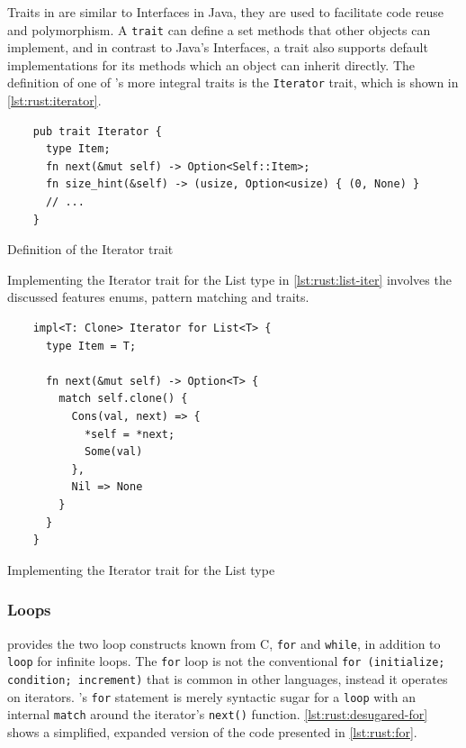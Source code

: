 Traits in \rust are similar to Interfaces in Java, they are used to facilitate code reuse and polymorphism.
A \texttt{trait} can define a set methods that other objects can implement, and in contrast to Java's Interfaces, a trait also supports default implementations for its methods which an object can inherit directly.
The definition of one of \rust's more integral traits is the \texttt{Iterator} trait, which is shown in \autoref{lst:rust:iterator}.

\begin{listing}[H]
  \begin{verbatim}
    pub trait Iterator {
      type Item;
      fn next(&mut self) -> Option<Self::Item>;
      fn size_hint(&self) -> (usize, Option<usize) { (0, None) }
      // ...
    }
  \end{verbatim}
  \caption{Definition of the Iterator trait}
  \label{lst:rust:iterator}
\end{listing}

Implementing the Iterator trait for the List type in \autoref{lst:rust:list-iter} involves the discussed features enums, pattern matching and traits.

\begin{listing}[H]
  \begin{verbatim}
    impl<T: Clone> Iterator for List<T> {
      type Item = T;

      fn next(&mut self) -> Option<T> {
        match self.clone() {
          Cons(val, next) => {
            *self = *next;
            Some(val)
          },
          Nil => None
        }
      }
    }
  \end{verbatim}
  \caption{Implementing the Iterator trait for the List type}
  \label{lst:rust:list-iter}
\end{listing}


\subsubsection{Loops}

\rust provides the two loop constructs known from C, \texttt{for} and \texttt{while}, in addition to \texttt{loop} for infinite loops.
The \texttt{for} loop is not the conventional \texttt{for (initialize; condition; increment)} that is common in other languages, instead it operates on iterators.
\rust's \texttt{for} statement is merely syntactic sugar for a \texttt{loop} with an internal \texttt{match} around the iterator's \texttt{next()} function.
\autoref{lst:rust:desugared-for} shows a simplified, expanded version of the code presented in \autoref{lst:rust:for}.

